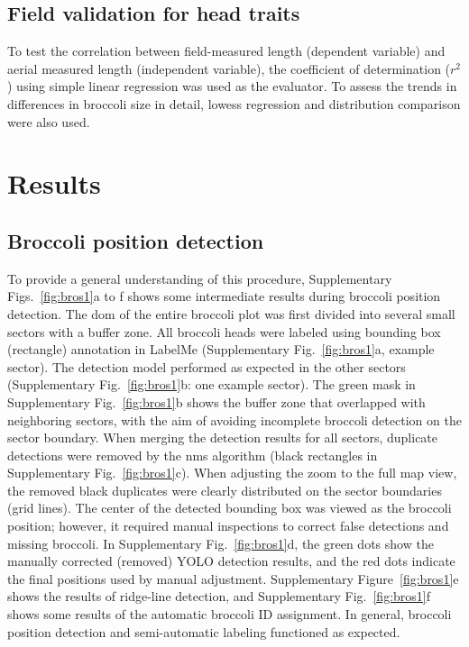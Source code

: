 \subsection{Field validation for head traits}

To test the correlation between field-measured length (dependent variable) and aerial measured length (independent variable), the coefficient of determination ($r^2$) using simple linear regression was used as the evaluator. To assess the trends in differences in broccoli size in detail, \gls{lowess} regression and distribution comparison were also used.

\section{Results}

\subsection{Broccoli position detection}

To provide a general understanding of this procedure, Supplementary Figs.~\ref{fig:bros1}a to f shows some intermediate results during broccoli position detection. The \gls{dom} of the entire broccoli plot was first divided into several small sectors with a buffer zone. All broccoli heads were labeled using bounding box (rectangle) annotation in LabelMe (Supplementary Fig.~\ref{fig:bros1}a, example sector). The detection model performed as expected in the other sectors (Supplementary Fig.~\ref{fig:bros1}b: one example sector). The green mask in Supplementary Fig.~\ref{fig:bros1}b shows the buffer zone that overlapped with neighboring sectors, with the aim of avoiding incomplete broccoli detection on the sector boundary. When merging the detection results for all sectors, duplicate detections were removed by the \gls{nms} algorithm (black rectangles in Supplementary Fig.~\ref{fig:bros1}c). When adjusting the zoom to the full map view, the removed black duplicates were clearly distributed on the sector boundaries (grid lines). The center of the detected bounding box was viewed as the broccoli position; however, it required manual inspections to correct false detections and missing broccoli. In Supplementary Fig.~\ref{fig:bros1}d, the green dots show the manually corrected (removed) YOLO detection results, and the red dots indicate the final positions used by manual adjustment. Supplementary Figure~\ref{fig:bros1}e shows the results of ridge-line detection, and Supplementary Fig.~\ref{fig:bros1}f shows some results of the automatic broccoli ID assignment. In general, broccoli position detection and semi-automatic labeling functioned as expected.

